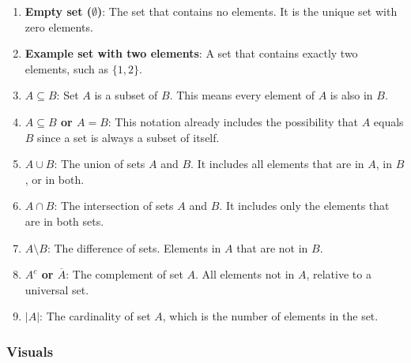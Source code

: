 \begin{enumerate}
    \item \textbf{Empty set ($\emptyset$)}: The set that contains no elements. It is the unique set with zero elements.
    
    \item \textbf{Example set with two elements}: A set that contains exactly two elements, such as $\{1, 2\}$.
    
    \item \textbf{$A \subseteq B$}: Set $A$ is a subset of $B$. This means every element of $A$ is also in $B$.
    
    \item \textbf{$A \subseteq B$ or $A = B$}: This notation already includes the possibility that $A$ equals $B$ since a set is always a subset of itself.
    
    \item \textbf{$A \cup B$}: The union of sets $A$ and $B$. It includes all elements that are in $A$, in $B$, or in both.
    
    \item \textbf{$A \cap B$}: The intersection of sets $A$ and $B$. It includes only the elements that are in both sets.
    
    \item \textbf{$A \setminus B$}: The difference of sets. Elements in $A$ that are not in $B$.
    
    \item \textbf{$A^c$ or $\overline{A}$}: The complement of set $A$. All elements not in $A$, relative to a universal set.
    
    \item \textbf{$|A|$}: The cardinality of set $A$, which is the number of elements in the set.
\end{enumerate}

\smallskip
\subsubsection{Visuals}

